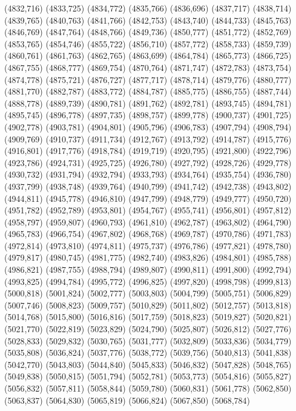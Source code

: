 (4832,716)
(4833,725)
(4834,772)
(4835,766)
(4836,696)
(4837,717)
(4838,714)
(4839,765)
(4840,763)
(4841,766)
(4842,753)
(4843,740)
(4844,733)
(4845,763)
(4846,769)
(4847,764)
(4848,766)
(4849,736)
(4850,777)
(4851,772)
(4852,769)
(4853,765)
(4854,746)
(4855,722)
(4856,710)
(4857,772)
(4858,733)
(4859,739)
(4860,761)
(4861,763)
(4862,765)
(4863,699)
(4864,784)
(4865,773)
(4866,725)
(4867,755)
(4868,777)
(4869,754)
(4870,764)
(4871,747)
(4872,783)
(4873,754)
(4874,778)
(4875,721)
(4876,727)
(4877,717)
(4878,714)
(4879,776)
(4880,777)
(4881,770)
(4882,787)
(4883,772)
(4884,787)
(4885,775)
(4886,755)
(4887,744)
(4888,778)
(4889,739)
(4890,781)
(4891,762)
(4892,781)
(4893,745)
(4894,781)
(4895,745)
(4896,778)
(4897,735)
(4898,757)
(4899,778)
(4900,737)
(4901,725)
(4902,778)
(4903,781)
(4904,801)
(4905,796)
(4906,783)
(4907,794)
(4908,794)
(4909,769)
(4910,737)
(4911,734)
(4912,767)
(4913,792)
(4914,787)
(4915,776)
(4916,801)
(4917,776)
(4918,784)
(4919,719)
(4920,795)
(4921,800)
(4922,796)
(4923,786)
(4924,731)
(4925,725)
(4926,780)
(4927,792)
(4928,726)
(4929,778)
(4930,732)
(4931,794)
(4932,794)
(4933,793)
(4934,764)
(4935,754)
(4936,780)
(4937,799)
(4938,748)
(4939,764)
(4940,799)
(4941,742)
(4942,738)
(4943,802)
(4944,811)
(4945,778)
(4946,810)
(4947,799)
(4948,779)
(4949,777)
(4950,720)
(4951,782)
(4952,789)
(4953,801)
(4954,767)
(4955,741)
(4956,801)
(4957,812)
(4958,797)
(4959,807)
(4960,793)
(4961,810)
(4962,787)
(4963,802)
(4964,790)
(4965,783)
(4966,754)
(4967,802)
(4968,768)
(4969,787)
(4970,786)
(4971,783)
(4972,814)
(4973,810)
(4974,811)
(4975,737)
(4976,786)
(4977,821)
(4978,780)
(4979,817)
(4980,745)
(4981,775)
(4982,740)
(4983,826)
(4984,801)
(4985,788)
(4986,821)
(4987,755)
(4988,794)
(4989,807)
(4990,811)
(4991,800)
(4992,794)
(4993,825)
(4994,784)
(4995,772)
(4996,825)
(4997,820)
(4998,798)
(4999,813)
(5000,818)
(5001,824)
(5002,777)
(5003,803)
(5004,799)
(5005,751)
(5006,829)
(5007,746)
(5008,823)
(5009,757)
(5010,829)
(5011,802)
(5012,757)
(5013,818)
(5014,768)
(5015,800)
(5016,816)
(5017,759)
(5018,823)
(5019,827)
(5020,821)
(5021,770)
(5022,819)
(5023,829)
(5024,790)
(5025,807)
(5026,812)
(5027,776)
(5028,833)
(5029,832)
(5030,765)
(5031,777)
(5032,809)
(5033,836)
(5034,779)
(5035,808)
(5036,824)
(5037,776)
(5038,772)
(5039,756)
(5040,813)
(5041,838)
(5042,770)
(5043,803)
(5044,840)
(5045,833)
(5046,832)
(5047,828)
(5048,765)
(5049,838)
(5050,815)
(5051,794)
(5052,781)
(5053,773)
(5054,816)
(5055,827)
(5056,832)
(5057,811)
(5058,844)
(5059,780)
(5060,831)
(5061,778)
(5062,850)
(5063,837)
(5064,830)
(5065,819)
(5066,824)
(5067,850)
(5068,784)
